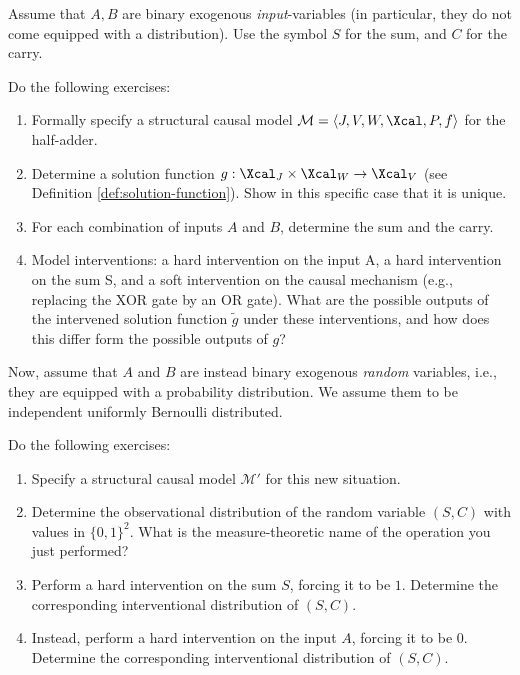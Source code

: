 \begin{enumerate}
Assume that $A, B$ are binary exogenous \emph{input}-variables (in particular, they do not come equipped with a distribution). 
Use the symbol $S$ for the sum, and $C$ for the carry.

Do the following exercises:
\begin{enumerate}
  \item  Formally specify a structural causal model $\mathcal{M} = \left\langle J, V, W, \Xcal, P, f\right\rangle$ for the half-adder.
  \item Determine a solution function $g: \Xcal_J \times \Xcal_W \to \Xcal_V$ (see Definition \ref*{def:solution-function}). Show in this specific case that it is unique.
  \item For each combination of inputs $A$ and $B$, determine the sum and the carry.
  \item Model interventions: a hard intervention on the input A, a hard intervention on the sum S, and a soft intervention on the causal mechanism (e.g., replacing the XOR gate by an OR gate).
  What are the possible outputs of the intervened solution function $\tilde{g}$ under these interventions, and how does this differ form the possible outputs of $g$?
\end{enumerate} 

Now, assume that $A$ and $B$ are instead binary exogenous \emph{random} variables, i.e., they are equipped with a probability distribution.
We assume them to be independent uniformly Bernoulli distributed.

Do the following exercises:
\begin{enumerate}[resume*]
  \item Specify a structural causal model $\mathcal{M}'$ for this new situation.
  \item Determine the observational distribution of the random variable $(S, C)$ with values in $\{0, 1\}^2$. What is the measure-theoretic name of the operation you just performed?
  \item Perform a hard intervention on the sum $S$, forcing it to be $1$. Determine the corresponding interventional distribution of $(S, C)$.
  \item Instead, perform a hard intervention on the input $A$, forcing it to be $0$. Determine the corresponding interventional distribution of $(S, C)$.
\end{enumerate}


\end{enumerate}
